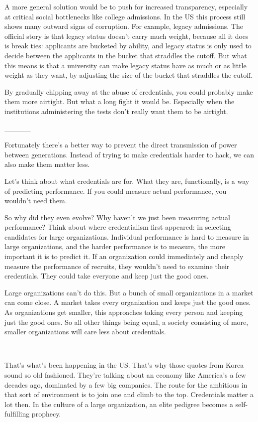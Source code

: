 A more general solution would be to push for increased transparency,
especially at critical social bottlenecks like college admissions. In
the US this process still shows many outward signs of corruption. For
example, legacy admissions. The official story is that legacy status
doesn't carry much weight, because all it does is break ties: applicants
are bucketed by ability, and legacy status is only used to decide
between the applicants in the bucket that straddles the cutoff. But what
this means is that a university can make legacy status have as much or
as little weight as they want, by adjusting the size of the bucket that
straddles the cutoff.

By gradually chipping away at the abuse of credentials, you could
probably make them more airtight. But what a long fight it would be.
Especially when the institutions administering the tests don't really
want them to be airtight.

\_\_\_\_\_

Fortunately there's a better way to prevent the direct transmission of
power between generations. Instead of trying to make credentials harder
to hack, we can also make them matter less.

Let's think about what credentials are for. What they are, functionally,
is a way of predicting performance. If you could measure actual
performance, you wouldn't need them.

So why did they even evolve? Why haven't we just been measuring actual
performance? Think about where credentialism first appeared: in
selecting candidates for large organizations. Individual performance is
hard to measure in large organizations, and the harder performance is to
measure, the more important it is to predict it. If an organization
could immediately and cheaply measure the performance of recruits, they
wouldn't need to examine their credentials. They could take everyone and
keep just the good ones.

Large organizations can't do this. But a bunch of small organizations in
a market can come close. A market takes every organization and keeps
just the good ones. As organizations get smaller, this approaches taking
every person and keeping just the good ones. So all other things being
equal, a society consisting of more, smaller organizations will care
less about credentials.

\_\_\_\_\_

That's what's been happening in the US. That's why those quotes from
Korea sound so old fashioned. They're talking about an economy like
America's a few decades ago, dominated by a few big companies. The route
for the ambitious in that sort of environment is to join one and climb
to the top. Credentials matter a lot then. In the culture of a large
organization, an elite pedigree becomes a self-fulfilling prophecy.

